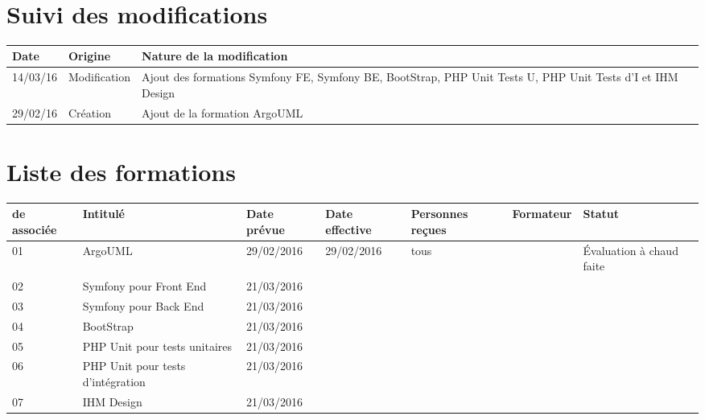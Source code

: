 \documentclass[asi,sansVersion]{picInsa}
\begin{document}
	\begin{center}
		\LARGE
		\textsc{
			\PF{}\\
		}
	\end{center}
	\vspace{0.5cm}

	\section*{Suivi des modifications}
	\begin{table}[H]
		\centering
		\begin{tabularx}{18cm}{|p{1.7cm}|p{4cm}|X|}
		\hline
		\rowcolor[gray]{0.85} Date & Origine & Nature de la modification\\\hline
		14/03/16 & Modification & Ajout des formations Symfony FE, Symfony BE, BootStrap, PHP Unit Tests U, PHP Unit Tests d'I et IHM Design \\ \hline
		29/02/16 & Création & Ajout de la formation ArgoUML\\ \hline
		
		\end{tabularx}
	\end{table}
	
	\section*{Liste des formations}
		\begin{longtable}{|p{2cm}|p{3.5cm}|p{2cm}|p{2cm}|p{2cm}|c|p{2cm}|}
			\hline
			\rowcolor{gris2}
			\No{} de \FFCourt{} associée & Intitulé & Date prévue & Date effective & Personnes reçues & Formateur & Statut \\\hline
			01 & ArgoUML & 29/02/2016 & 29/02/2016 & tous & \Julie{} & Évaluation à chaud faite\\\hline
			02 & Symfony pour Front End & 21/03/2016 &  &  &  & \\\hline
			03 & Symfony pour Back End & 21/03/2016 &  &  &  & \\\hline
			04 & BootStrap & 21/03/2016 &  &  &  & \\\hline
			05 & PHP Unit pour tests unitaires & 21/03/2016 &  &  &  & \\\hline
			06 & PHP Unit pour tests d'intégration & 21/03/2016 &  &  &  & \\\hline
			07 & IHM Design & 21/03/2016 &  &  &  & \\\hline
		\end{longtable}
\end{document}
